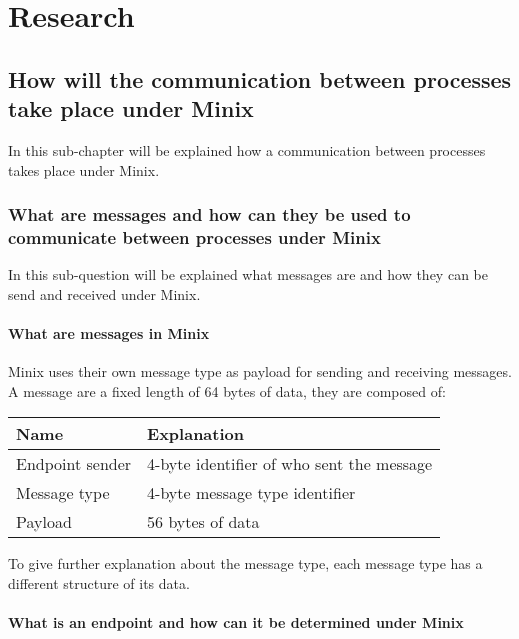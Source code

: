 \hypertarget{research}{%
\chapter{Research}\label{research}}

\hypertarget{how-will-the-communication-between-processes-take-place-under-minix}{%
\section{How will the communication between processes take place under
Minix}\label{how-will-the-communication-between-processes-take-place-under-minix}}

In this sub-chapter will be explained how a communication between
processes takes place under Minix.

\hypertarget{what-are-messages-and-how-can-they-be-used-to-communicate-between-processes-under-minix}{%
\subsection{What are messages and how can they be used to communicate
between processes under
Minix}\label{what-are-messages-and-how-can-they-be-used-to-communicate-between-processes-under-minix}}

In this sub-question will be explained what messages are and how they
can be send and received under Minix.

\hypertarget{what-are-messages-in-minix}{%
\subsubsection{What are messages in
Minix}\label{what-are-messages-in-minix}}

Minix uses their own message type as payload for sending and receiving
messages. A message are a fixed length of 64 bytes of data, they are
composed of:

\begin{longtable}[]{@{}ll@{}}
\toprule
Name & Explanation\tabularnewline
\midrule
\endhead
Endpoint sender & 4-byte identifier of who sent the
message\tabularnewline
Message type & 4-byte message type identifier\tabularnewline
Payload & 56 bytes of data\tabularnewline
\bottomrule
\end{longtable}

To give further explanation about the message type, each message type
has a different structure of its data.

\hypertarget{what-is-an-endpoint-and-how-can-it-be-determined-under-minix}{%
\subsubsection{What is an endpoint and how can it be determined under
Minix}\label{what-is-an-endpoint-and-how-can-it-be-determined-under-minix}}


